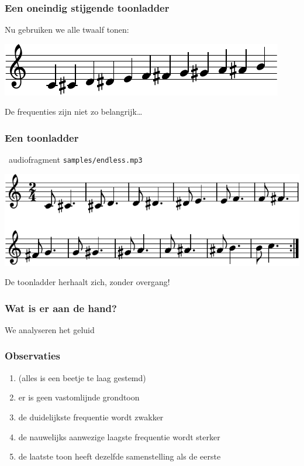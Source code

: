\documentclass[compress, darktitle, framenumber, totalframenumber]{beamer}
\begin{document}
\begin{frame}
  \frametitle{Een oneindig stijgende toonladder}

  Nu gebruiken we alle twaalf tonen:
  \begin{center}
    \includegraphics{scores/scale-full-cropped}
  \end{center}
  De frequenties zijn niet zo belangrijk\ldots
\end{frame}

\begin{frame}
  \frametitle{Een toonladder}

  \begin{block}{\twonotes\ audiofragment}
    \texttt{samples/endless.mp3}
  \end{block}
  \pause
  \begin{center}
    \includegraphics{scores/endless-cropped}
  \end{center}
  \pause
  De toonladder \alert{herhaalt} zich, zonder overgang!
\end{frame}

\begin{frame}
  \frametitle{Wat is er aan de hand?}

  We analyseren het geluid
\end{frame}

\begin{frame}
  \frametitle{Observaties}

  \begin{enumerate}
    \item (alles is een beetje te laag gestemd)
    \item er is geen vastomlijnde grondtoon
    \item de duidelijkste frequentie wordt \alert{zwakker}
    \item de nauwelijks aanwezige laagste frequentie wordt \alert{sterker}
    \item de laatste toon heeft dezelfde samenstelling als de eerste
  \end{enumerate}
\end{frame}
\end{document}
